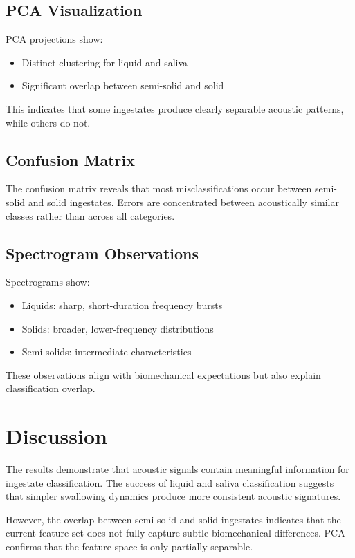 \documentclass[conference]{IEEEtran}
\begin{document}
\subsection{PCA Visualization}

PCA projections show:
\begin{itemize}
    \item Distinct clustering for liquid and saliva
    \item Significant overlap between semi-solid and solid
\end{itemize}

This indicates that some ingestates produce clearly separable acoustic patterns, while others do not.

\subsection{Confusion Matrix}

The confusion matrix reveals that most misclassifications occur between semi-solid and solid ingestates. Errors are concentrated between acoustically similar classes rather than across all categories.

\subsection{Spectrogram Observations}

Spectrograms show:
\begin{itemize}
    \item Liquids: sharp, short-duration frequency bursts
    \item Solids: broader, lower-frequency distributions
    \item Semi-solids: intermediate characteristics
\end{itemize}

These observations align with biomechanical expectations but also explain classification overlap.

\section{Discussion}

The results demonstrate that acoustic signals contain meaningful information for ingestate classification. The success of liquid and saliva classification suggests that simpler swallowing dynamics produce more consistent acoustic signatures.

However, the overlap between semi-solid and solid ingestates indicates that the current feature set does not fully capture subtle biomechanical differences. PCA confirms that the feature space is only partially separable.
\end{document}
